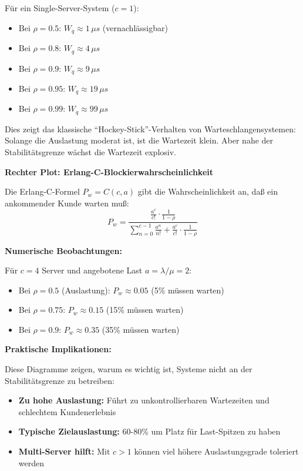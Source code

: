 \documentclass[a4paper,11pt]{article}
\theoremstyle{definition}
\begin{document}
Für ein Single-Server-System ($c = 1$):
\begin{itemize}
    \item Bei $\rho = 0.5$: $W_q \approx 1 \, \mu s$ (vernachlässigbar)
    \item Bei $\rho = 0.8$: $W_q \approx 4 \, \mu s$
    \item Bei $\rho = 0.9$: $W_q \approx 9 \, \mu s$
    \item Bei $\rho = 0.95$: $W_q \approx 19 \, \mu s$
    \item Bei $\rho = 0.99$: $W_q \approx 99 \, \mu s$
\end{itemize}

Dies zeigt das klassische ``Hockey-Stick''-Verhalten von Warteschlangensystemen: Solange die 
Auslastung moderat ist, ist die Wartezeit klein. Aber nahe der Stabilitätsgrenze wächst die 
Wartezeit explosiv.

\textbf{Rechter Plot: Erlang-C-Blockierwahrscheinlichkeit}

Die Erlang-C-Formel $P_w = C(c, a)$ gibt die Wahrscheinlichkeit an, daß ein ankommender 
Kunde warten muß:
\[
    P_w = \frac{\frac{a^c}{c!} \cdot \frac{1}{1-\rho}}{\sum_{n=0}^{c-1} \frac{a^n}{n!} + 
           \frac{a^c}{c!} \cdot \frac{1}{1-\rho}}
\]

\textbf{Numerische Beobachtungen:}

Für $c = 4$ Server und angebotene Last $a = \lambda/\mu = 2$:
\begin{itemize}
    \item Bei $\rho = 0.5$ (Auslastung): $P_w \approx 0.05$ (5\% müssen warten)
    \item Bei $\rho = 0.75$: $P_w \approx 0.15$ (15\% müssen warten)
    \item Bei $\rho = 0.9$: $P_w \approx 0.35$ (35\% müssen warten)
\end{itemize}

\textbf{Praktische Implikationen:}

Diese Diagramme zeigen, warum es wichtig ist, Systeme nicht an der Stabilitätsgrenze zu betreiben:
\begin{itemize}
    \item \textbf{Zu hohe Auslastung:} Führt zu unkontrollierbaren Wartezeiten und 
          schlechtem Kundenerlebnis
    \item \textbf{Typische Zielauslastung:} 60-80\% um Platz für Last-Spitzen zu haben
    \item \textbf{Multi-Server hilft:} Mit $c > 1$ können viel höhere Auslastungsgrade 
          toleriert werden
\end{itemize}
\end{document}
